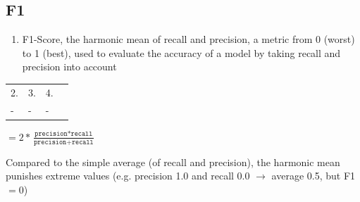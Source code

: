 \documentclass[12pt,a4paper]{article}
\begin{document}
\subsection{F1}
\begin{enumerate}
\item F1-Score, the harmonic mean of recall and precision, a metric from 0 (worst) to 1 (best), used to evaluate the accuracy of a model by taking recall and precision into account 
\end{enumerate}
\begin{tabular}{|l|l|l|l|}
\hline
2. & 3. & 4.\\ 
- & - & - \\ \hline
\end{tabular}
\begin{description}
\item $=2*\frac{\texttt{precision} * \texttt{recall}}{\texttt{precision}+\texttt{recall}}$
\item Compared to the simple average (of recall and precision), the harmonic mean punishes extreme values (e.g. precision 1.0 and recall 0.0 $\rightarrow$ average 0.5, but F1 $= 0$)
\end{description}
%
\end{document}
